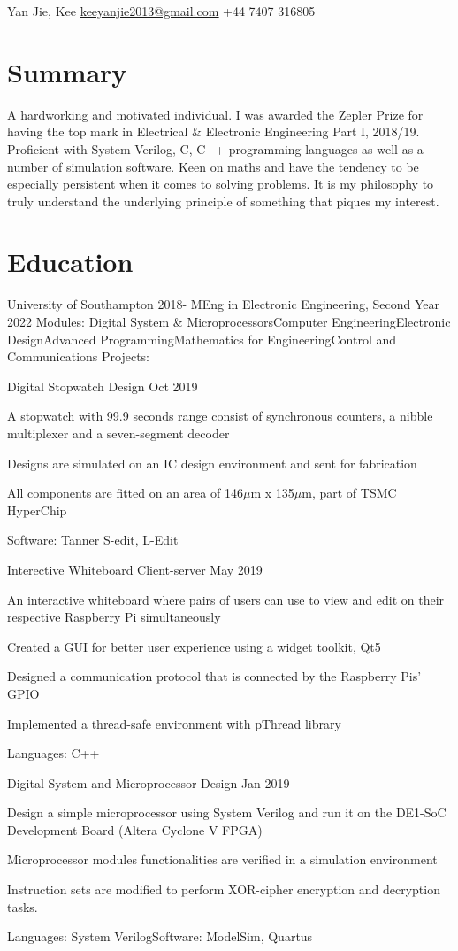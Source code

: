 \documentclass{myresume2}
\begin{document}
%
\theHeader
  {Yan Jie, Kee}
  {\href{mailto:keeyanjie2013@gmail.com}{\underline{keeyanjie2013@gmail.com}}}
  {+44 7407 316805}
%
%
%
%
\section{Summary}
A hardworking and motivated individual. I was awarded the Zepler Prize for having the top mark in Electrical \& Electronic Engineering Part I, 2018/19. Proficient with System Verilog, C, C++ programming languages as well as a number of simulation software. Keen on maths and have the tendency to be especially persistent when it comes to solving problems. It is my philosophy to truly understand the underlying principle of something that piques my interest.
%
%
%
%
\section{Education}
%
\headEntry
  {University of Southampton}
  {2018-}
  {MEng in Electronic Engineering, Second Year}
  {2022}
\twocolumnEntry
  {Modules:}
  {Digital System \& Microprocessors\s Computer Engineering\s Electronic Design\s Advanced Programming\s Mathematics for Engineering\s Control and Communications}\vspace{1.5ex}
\twocolumnEntry
  {Projects:}
  {%
  \projectEntry
    {Digital Stopwatch Design}
    {Oct 2019}
    {\item A stopwatch with 99.9 seconds range consist of synchronous counters, a nibble multiplexer and a seven-segment decoder
    \item Designs are simulated on an IC design environment and sent for fabrication
    \item All components are fitted on an area of 146$\mu$m x 135$\mu$m, part of TSMC HyperChip}
    {Software: Tanner S-edit, L-Edit}

  \projectEntry
    {Interective Whiteboard Client-server}
    {May 2019}
    {\item An interactive whiteboard where pairs of users can use to view and edit on their respective Raspberry Pi simultaneously
    \item Created a GUI for better user experience using a widget toolkit, Qt5
    \item Designed a communication protocol that is connected by the Raspberry Pis' GPIO
    \item Implemented a thread-safe environment with pThread library}
    {Languages: C++}

  \projectEntry
    {Digital System and Microprocessor Design}
    {Jan 2019}
    {\item Design a simple microprocessor using System Verilog and run it on the DE1-SoC Development Board (Altera Cyclone V FPGA)
    \item Microprocessor modules functionalities are verified in a simulation environment
    \item Instruction sets are modified to perform XOR-cipher encryption and decryption tasks.}
    {Languages: System Verilog\bigs Software: ModelSim, Quartus}
  }
\end{document}
